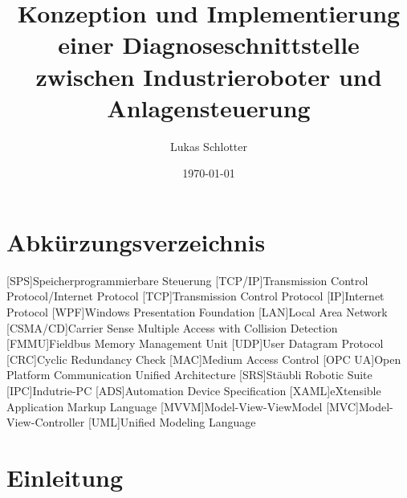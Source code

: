 \documentclass[ a4paper,
                oneside,
                toc=bibliography,
                toc=listof
                ]{scrbook}
\author{Lukas Schlotter}
\title{Konzeption und Implementierung einer Diagnoseschnittstelle zwischen Industrieroboter und Anlagensteuerung}
\date{\today}
\begin{document}
 
    \frontmatter
    \makeISWtitle
    
    \cleardoublepage
	\setcounter{page}{1} %
    \declarationOfOriginality

    
    
    \cleardoublepage
    \tableofcontents
    
  	\newpage
    \chapter*{Abkürzungsverzeichnis}
    \begin{acronym}[CSMA/CD]
    	[SPS]{Speicherprogrammierbare Steuerung}
    	[TCP/IP]{Transmission Control Protocol/Internet Protocol}
    	[TCP]{Transmission Control Protocol}
    	[IP]{Internet Protocol}
    	[WPF]{Windows Presentation Foundation}
    	[LAN]{Local Area Network}
    	[CSMA/CD]{Carrier Sense Multiple Access with Collision Detection}
    	[FMMU]{Fieldbus Memory Management Unit}
    	[UDP]{User Datagram Protocol}
    	[CRC]{Cyclic Redundancy Check}
    	[MAC]{Medium Access Control}
    	[OPC UA]{Open Platform Communication Unified Architecture}
    	[SRS]{Stäubli Robotic Suite}
    	[IPC]{Indutrie-PC}
    	[ADS]{Automation Device Specification}
    	[XAML]{eXtensible Application Markup Language}
    	[MVVM]{Model-View-ViewModel}
    	[MVC]{Model-View-Controller}
    	[UML]{Unified Modeling Language}
    	
    \end{acronym}

    \mainmatter
    
    \chapter{Einleitung}
\end{document}
